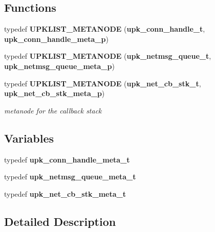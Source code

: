 \subsection*{Functions}
\begin{DoxyCompactItemize}
\item 
typedef {\bf UPKLIST\_\-METANODE} ({\bf upk\_\-conn\_\-handle\_\-t}, {\bf upk\_\-conn\_\-handle\_\-meta\_\-p})
\item 
typedef {\bf UPKLIST\_\-METANODE} ({\bf upk\_\-netmsg\_\-queue\_\-t}, {\bf upk\_\-netmsg\_\-queue\_\-meta\_\-p})
\item 
typedef {\bf UPKLIST\_\-METANODE} ({\bf upk\_\-net\_\-cb\_\-stk\_\-t}, {\bf upk\_\-net\_\-cb\_\-stk\_\-meta\_\-p})
\begin{DoxyCompactList}\small\item\em metanode for the callback stack \end{DoxyCompactList}\end{DoxyCompactItemize}
\subsection*{Variables}
\begin{DoxyCompactItemize}
\item 
typedef {\bf upk\_\-conn\_\-handle\_\-meta\_\-t}
\item 
typedef {\bf upk\_\-netmsg\_\-queue\_\-meta\_\-t}
\item 
typedef {\bf upk\_\-net\_\-cb\_\-stk\_\-meta\_\-t}
\end{DoxyCompactItemize}


\subsection{Detailed Description}
